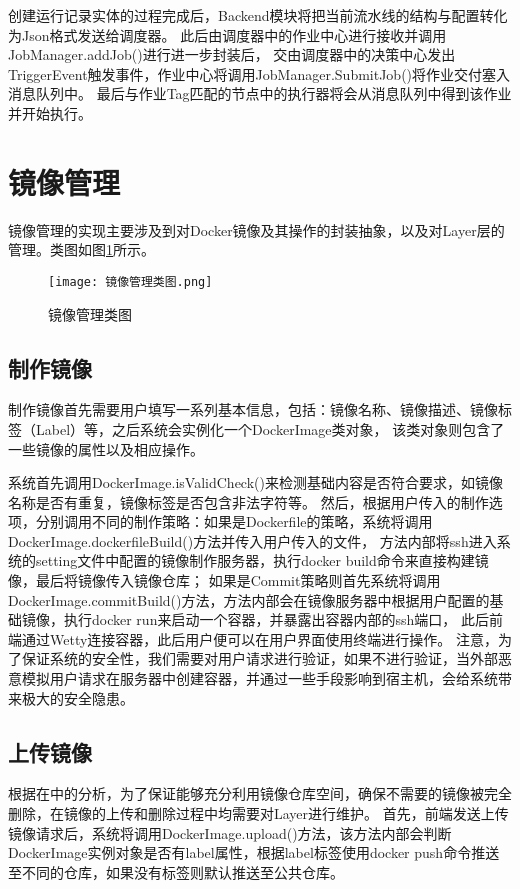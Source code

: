 创建运行记录实体的过程完成后，Backend模块将把当前流水线的结构与配置转化为Json格式发送给调度器。
此后由调度器中的作业中心进行接收并调用JobManager.addJob()进行进一步封装后，
交由调度器中的决策中心发出TriggerEvent触发事件，作业中心将调用JobManager.SubmitJob()将作业交付塞入消息队列中。
最后与作业Tag匹配的节点中的执行器将会从消息队列中得到该作业并开始执行。

\section{镜像管理}
镜像管理的实现主要涉及到对Docker镜像及其操作的封装抽象，以及对Layer层的管理。类图如图\ref{fig:镜像管理类图}所示。

\begin{figure}[h]
  \centering
  \texttt{[image: 镜像管理类图.png]}
  \caption{镜像管理类图}
  \label{fig:镜像管理类图}
\end{figure}

\subsection{制作镜像}
制作镜像首先需要用户填写一系列基本信息，包括：镜像名称、镜像描述、镜像标签（Label）等，之后系统会实例化一个DockerImage类对象，
该类对象则包含了一些镜像的属性以及相应操作。

系统首先调用DockerImage.isValidCheck()来检测基础内容是否符合要求，如镜像名称是否有重复，镜像标签是否包含非法字符等。
然后，根据用户传入的制作选项，分别调用不同的制作策略：如果是Dockerfile的策略，系统将调用DockerImage.dockerfileBuild()方法并传入用户传入的文件，
方法内部将ssh进入系统的setting文件中配置的镜像制作服务器，执行docker build命令来直接构建镜像，最后将镜像传入镜像仓库；
如果是Commit策略则首先系统将调用DockerImage.commitBuild()方法，方法内部会在镜像服务器中根据用户配置的基础镜像，执行docker run来启动一个容器，并暴露出容器内部的ssh端口，
此后前端通过Wetty连接容器，此后用户便可以在用户界面使用终端进行操作。
注意，为了保证系统的安全性，我们需要对用户请求进行验证，如果不进行验证，当外部恶意模拟用户请求在服务器中创建容器，并通过一些手段影响到宿主机，会给系统带来极大的安全隐患。

\subsection{上传镜像}
根据在中的分析，为了保证能够充分利用镜像仓库空间，确保不需要的镜像被完全删除，在镜像的上传和删除过程中均需要对Layer进行维护。
首先，前端发送上传镜像请求后，系统将调用DockerImage.upload()方法，该方法内部会判断DockerImage实例对象是否有label属性，根据label标签使用docker push命令推送至不同的仓库，如果没有标签则默认推送至公共仓库。

